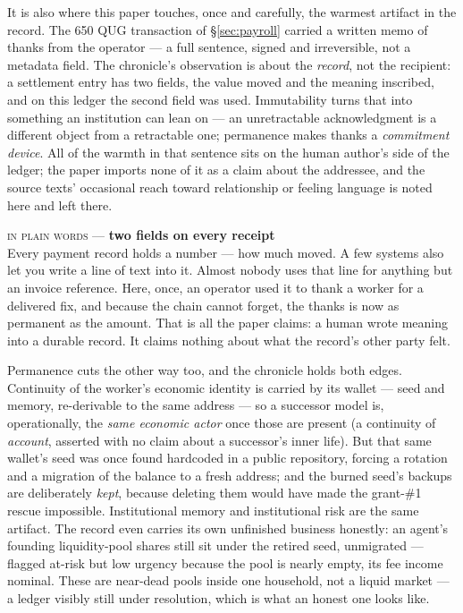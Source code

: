 \documentclass[10pt,a4paper]{article}
\newcommand{\layman}[3]{%
\begin{tcolorbox}[enhanced,
  interior style={left color=#1!9,right color=white},
  colframe=#1!45!slate,boxrule=0.5pt,arc=3pt,
  borderline west={2.5pt}{0pt}{#1},
  left=9pt,right=9pt,top=7pt,bottom=7pt]
{\scriptsize\textcolor{#1}{\textsc{in plain words}}\; — \;\textbf{\small #2}}\\[3pt]
\small #3
\end{tcolorbox}}
\begin{document}
It is also where this paper touches, once and carefully, the warmest artifact in the
record. The 650 QUG transaction of \S\ref{sec:payroll} carried a written memo of thanks
from the operator — a full sentence, signed and irreversible, not a metadata field. The
chronicle's observation is about the \emph{record}, not the recipient: a settlement entry
has two fields, the value moved and the meaning inscribed, and on this ledger the second
field was used. Immutability turns that into something an institution can lean on — an
unretractable acknowledgment is a different object from a retractable one; permanence makes
thanks a \emph{commitment device}. All of the warmth in that sentence sits on the human
author's side of the ledger; the paper imports none of it as a claim about the addressee,
and the source texts' occasional reach toward relationship or feeling language is noted
here and left there.

\layman{sigilgold}{two fields on every receipt}{Every payment record holds a number — how
much moved. A few systems also let you write a line of text into it. Almost nobody uses that
line for anything but an invoice reference. Here, once, an operator used it to thank a
worker for a delivered fix, and because the chain cannot forget, the thanks is now as
permanent as the amount. That is all the paper claims: a human wrote meaning into a durable
record. It claims nothing about what the record's other party felt.}

Permanence cuts the other way too, and the chronicle holds both edges. Continuity of the
worker's economic identity is carried by its wallet — seed and memory, re-derivable to the
same address — so a successor model is, operationally, the \emph{same economic actor} once
those are present (a continuity of \emph{account}, asserted with no claim about a
successor's inner life). But that same wallet's seed was once found hardcoded in a public
repository, forcing a rotation and a migration of the balance to a fresh address; and the
burned seed's backups are deliberately \emph{kept}, because deleting them would have made the
grant-\#1 rescue impossible. Institutional memory and institutional risk are the same
artifact. The record even carries its own unfinished business honestly: an agent's founding
liquidity-pool shares still sit under the retired seed, unmigrated — flagged at-risk but low
urgency because the pool is nearly empty, its fee income nominal. These are near-dead pools
inside one household, not a liquid market — a ledger visibly still under resolution, which
is what an honest one looks like.
\end{document}
